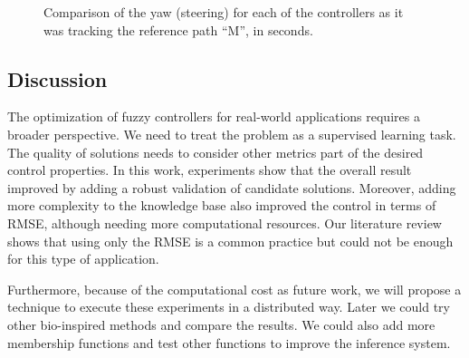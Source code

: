 \documentclass[symmetry,article,submit,moreauthors,pdftex]{Definitions/mdpi}
\begin{document}
\begin{figure}[h]
     \caption{Comparison of the yaw (steering) for each of the controllers as it was tracking the reference path ``M'', in seconds.}
        \label{fig:yaw}
\end{figure}
\begin{paracol}{2}
\linenumbers
\switchcolumn
\section{Discussion}\label{Discussion}

The optimization of fuzzy controllers for real-world applications requires a
broader perspective. We need to treat the problem as a supervised learning
task. The quality of solutions needs to consider other metrics part of the
desired control properties. In this work, experiments show that the overall
result improved by adding a robust validation of candidate solutions. Moreover,
adding more complexity to the knowledge base also improved the control in terms
of RMSE, although needing more computational resources. Our literature review
shows that using only the RMSE is a common practice but could not be enough for
this type of application.

Furthermore, because of the computational cost as future work, we will propose
a technique to execute these experiments in a distributed way. Later we could
try other bio-inspired methods and compare the results. We could also add more
membership functions and test other functions to improve the inference system.



%
%
\vspace{6pt} 



\end{paracol}
\end{document}

